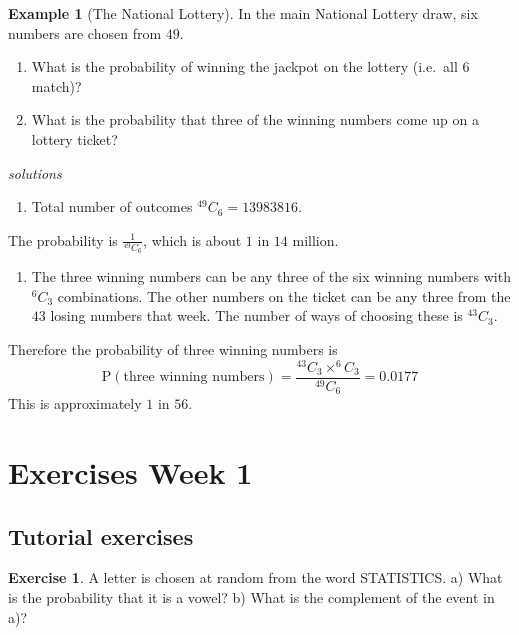 \documentclass[
]{book}
\providecommand{\tightlist}{%
  \setlength{\itemsep}{0pt}\setlength{\parskip}{0pt}}
\theoremstyle{definition}
\theoremstyle{definition}
\newtheorem{example}{Example}[chapter]
\theoremstyle{definition}
\newtheorem{exercise}{Exercise}[chapter]
\theoremstyle{definition}
\theoremstyle{remark}
\begin{document}
\begin{example}[The National Lottery]
In the main National Lottery draw, six numbers are chosen from \(49\).

\begin{enumerate}
\def\labelenumi{\alph{enumi})}
\item
  What is the probability of winning the jackpot on the lottery (i.e.~all \(6\) match)?
\item
  What is the probability that three of the winning numbers come up on a lottery ticket?
\end{enumerate}

\emph{solutions}

\begin{enumerate}
\def\labelenumi{\alph{enumi})}
\tightlist
\item
  Total number of outcomes \(^{49}C_{6} = 13983816\).
\end{enumerate}

The probability is \(\frac{1}{^{49}C_{6}}\), which is about \(1\) in \(14\) million.

\begin{enumerate}
\def\labelenumi{\alph{enumi})}
\setcounter{enumi}{1}
\tightlist
\item
  The three winning numbers can be any three of the six winning numbers with \(^6C_3\) combinations. The other numbers on the ticket can be any three from the \(43\) losing numbers that week. The number of ways of choosing these is \(^{43}C_3\).
\end{enumerate}

Therefore the probability of three winning numbers is
\[\text{P}(\text{three winning numbers}) = \frac{^{43}C_3 \times ^6C_3}{^{49}C_6} = 0.0177\]
This is approximately \(1\) in \(56\).
\end{example}

\hypertarget{exercises-week-1}{%
\section{Exercises Week 1}\label{exercises-week-1}}

\hypertarget{tutorial-exercises}{%
\subsection{Tutorial exercises}\label{tutorial-exercises}}

\begin{exercise}
A letter is chosen at random from the word STATISTICS.
a) What is the probability that it is a vowel?
b) What is the complement of the event in a)?
\end{exercise}
\end{document}

